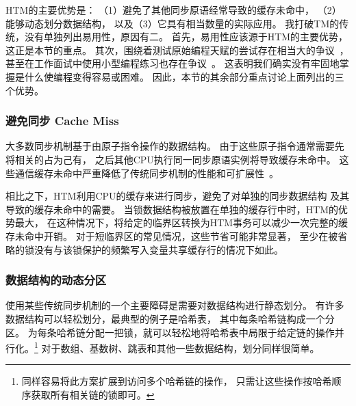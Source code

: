 HTM的主要优势是：
（1）避免了其他同步原语经常导致的缓存未命中，
（2）能够动态划分数据结构，
以及（3）它具有相当数量的实际应用。
我打破TM的传统，没有单独列出易用性，原因有二。
首先，易用性应该源于HTM的主要优势，这正是本节的重点。
其次，围绕着测试原始编程天赋的尝试存在相当大的争议~\cite{RichardBornat2006SheepGoats,SaeedDehnadi2009SheepGoats,ElizabethPatitsas2020GradesNotBimodal}，
甚至在工作面试中使用小型编程练习也存在争议~\cite{RegBraithwaite2007FizzBuzz}。
这表明我们确实没有牢固地掌握是什么使编程变得容易或困难。
因此，本节的其余部分重点讨论上面列出的三个优势。

\subsubsection{避免同步 Cache Miss}
\label{sec:future:Avoiding Synchronization Cache Misses}

大多数同步机制基于由原子指令操作的数据结构。
由于这些原子指令通常需要先将相关的占为己有，
之后其他CPU执行同一同步原语实例将导致缓存未命中。
这些通信缓存未命中严重降低了传统同步机制的性能和可扩展性~\cite[Section 4.2.3]{Anderson97}。

相比之下，HTM利用CPU的缓存来进行同步，避免了对单独的同步数据结构
及其导致的缓存未命中的需要。
当锁数据结构被放置在单独的缓存行中时，HTM的优势最大，
在这种情况下，将给定的临界区转换为HTM事务可以减少一次完整的缓存未命中开销。
对于短临界区的常见情况，这些节省可能非常显著，
至少在被省略的锁没有与该锁保护的频繁写入变量共享缓存行的情况下如此。

\QuickQuizEnd

\subsubsection{数据结构的动态分区}
\label{sec:future:Dynamic Partitioning of Data Structures}

使用某些传统同步机制的一个主要障碍是需要对数据结构进行静态划分。
有许多数据结构可以轻松划分，最典型的例子是哈希表，
其中每条哈希链构成一个分区。
为每条哈希链分配一把锁，就可以轻松地将哈希表中局限于给定链的操作并行化。\footnote{
	同样容易将此方案扩展到访问多个哈希链的操作，
	只需让这些操作按哈希顺序获取所有相关链的锁即可。}
对于数组、基数树、跳表和其他一些数据结构，划分同样很简单。

